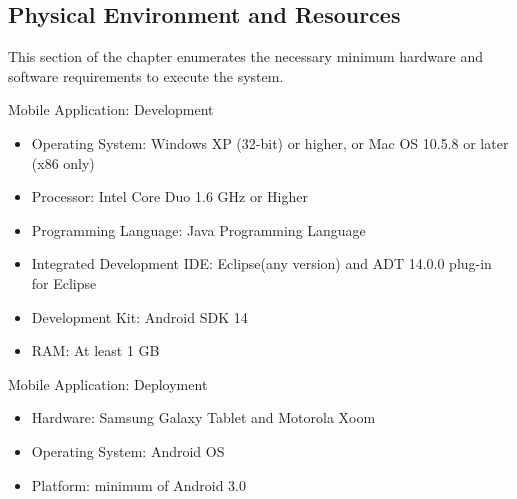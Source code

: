\pagebreak

\subsection{Physical Environment and Resources}
\label{sec:physicalenvironmentandresources}
This section of the chapter enumerates the necessary minimum hardware and software requirements to execute the system.

Mobile Application: Development
\begin{itemize}
\item Operating System: Windows XP (32-bit) or higher, or Mac OS 10.5.8 or later (x86 only)
\item Processor: Intel Core Duo 1.6 GHz or Higher
\item Programming Language: Java Programming Language
\item Integrated Development IDE: Eclipse(any version) and ADT 14.0.0 plug-in for Eclipse
\item Development Kit: Android SDK 14
\item RAM: At least 1 GB
\end{itemize}

Mobile Application: Deployment
\begin{itemize}
\item Hardware: Samsung Galaxy Tablet and Motorola Xoom
\item Operating System: Android OS
\item Platform: minimum of Android 3.0
\end{itemize}
